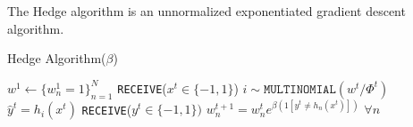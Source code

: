 \documentclass[11pt]{article}
\begin{document}
The Hedge algorithm is an unnormalized exponentiated gradient descent algorithm.
\begin{algorithm}
\caption{Hedge Algorithm($\beta$)}
\begin{algorithmic}[1]
    \STATE $w^1 \gets \{w^1_n = 1\}^N_{n=1}$
        \STATE \texttt{RECEIVE}($x^t \in \{-1,1\}$)
        \STATE $i \sim \texttt{MULTINOMIAL}(w^t / \Phi^t)$
        \STATE $\hat{y}^t = h_i(x^t)$
        \STATE \texttt{RECEIVE}($y^t \in \{-1,1\})$
        \STATE $w_n^{t+1} = w_n^t e^{\beta (1[y^t \neq h_n(x^t)])}$ $\forall n$
    \ENDFOR
\end{algorithmic}
\end{algorithm}
{


}


\end{document}

